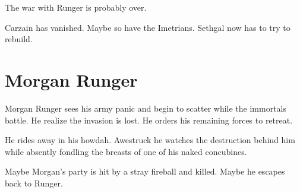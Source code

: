 The war with Runger is probably over. 

Carzain has vanished.
Maybe so have the Imetrians. 
Sethgal now has to try to rebuild. 





\section{Morgan Runger}
Morgan Runger sees his army panic and begin to scatter while the immortals battle. 
He realize the invasion is lost. 
He orders his remaining forces to retreat. 

He rides away in his howdah.
Awestruck he watches the destruction behind him while absently fondling the breasts of one of his naked concubines. 

Maybe Morgan's party is hit by a stray fireball and killed. 
Maybe he escapes back to Runger. 










